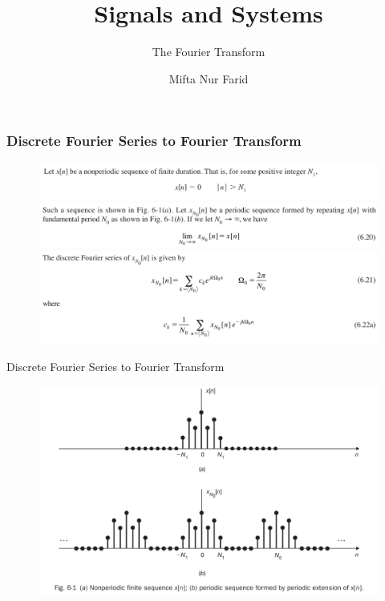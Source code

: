 \documentclass[pdflatex,compress,mathserif]{beamer}
\title{Signals and Systems}
\subtitle{The Fourier Transform}
\author{Mifta Nur Farid}
\begin{document}
\maketitle

\begin{frame}
	\frametitle{Discrete Fourier Series to Fourier Transform}
	\begin{figure}
		\centering
		\includegraphics[width=\linewidth]{img/img01}
		\includegraphics[width=\linewidth]{img/img02}
		\includegraphics[width=\linewidth]{img/img03}
	\end{figure}
\end{frame}

\begin{frame}{Discrete Fourier Series to Fourier Transform}
	\begin{figure}
		\centering
		\includegraphics[width=0.9\linewidth]{img/img04}
	\end{figure}
\end{frame}
\end{document}

